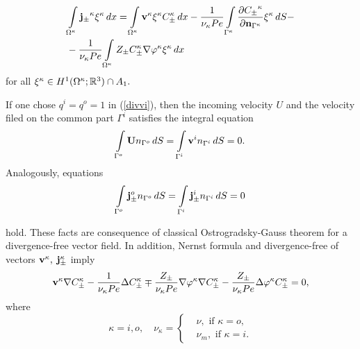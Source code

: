 \documentclass{amsart}
\begin{document}
\begin{dfn}
\begin{equation}\label{j0}
\begin{aligned}
&\int\limits_{\Omega^{\kappa}}{\bf j_{\pm}}^{\kappa}{\bf \xi}^{\kappa}\,dx=\int\limits_{\Omega^{\kappa}}{\bf v}^{\kappa}{\bf \xi}^{\kappa}C^{\kappa}_{\pm}\,dx-\frac{1}{\nu_{{\kappa}}Pe}\int\limits_{\Gamma^{\kappa}}
\frac{\partial{ C_{\pm}}^{\kappa}}{\partial{\bf n}_{\Gamma^{\kappa}}}{\bf \xi}^{\kappa}\,dS-\\
&-\frac{1}{\nu_{{\kappa}}Pe}\int\limits_{\Omega^{\kappa}}Z_{\pm}C^{\kappa}_{\pm}\nabla \varphi^{\kappa}{ \bf \xi}^{\kappa}\,dx
 \end{aligned}
\end{equation}
{ for all } ${\bf \xi}^{\kappa}\in H^1(\Omega^{\kappa};\mathbb{R}^3)\cap A_1.$
\end{dfn}

\begin{remark}
If one chose $q^i=q^o=1$ in (\ref{divvi}), then the incoming velocity $U$ and the velocity filed on the common part $\Gamma^i$ satisfies the integral equation
\begin{equation}\label{bondaryU}
\int\limits_{\Gamma^o}{\bf U}n_{\Gamma^o}\,dS=\int\limits_{\Gamma^i}{\bf v}^in_{\Gamma^i}\,dS=0.
\end{equation}
Analogously,  equations
\begin{equation}\label{bondaryj}
\int\limits_{\Gamma^o}{\bf j}^o_{\pm}n_{\Gamma^o}\,dS=\int\limits_{\Gamma^i}{\bf j}^i_{\pm} n_{\Gamma^i}\,dS=0
\end{equation}


hold. These facts are consequence of classical Ostrogradsky-Gauss theorem for a divergence-free vector field.
In addition, Nernst formula and divergence-free  of vectors $\bf v^{\kappa},$ ${\bf j}^{\kappa}_{\pm}$ imply
\begin{equation}\label{bondaryCfi}
{\bf v}^\kappa\nabla C^\kappa_{\pm}-\frac{1}{\nu_{\kappa}Pe}\Delta C^\kappa_{\pm}\mp\frac{Z_{\pm}}{\nu_{\kappa}Pe}\nabla \varphi^\kappa\nabla C_{\pm}^\kappa-\frac{Z_{\pm}}{\nu_{\kappa}Pe}\Delta \varphi^\kappa C_{\pm}^\kappa=0,
\end{equation}
 where $$\kappa=i,o,\quad \nu_{\kappa}=\begin{cases}&\nu, \text{ if } \kappa=o,\\
 &\nu_{m}, \text { if } \kappa=i.
 \end{cases}$$

\end{remark}
\end{document}
